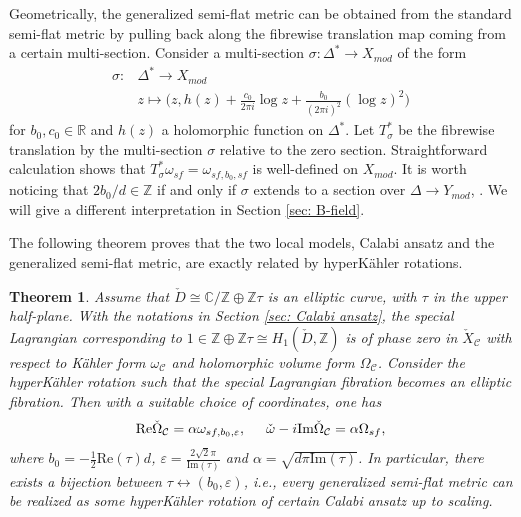 \documentclass[11pt]{amsart}
\theoremstyle{plain}
\newtheorem{thm}{Theorem}[section]
\theoremstyle{definition}
\numberwithin{equation}{section}
\renewcommand{\epsilon}{\varepsilon}
\begin{document}
 Geometrically, the generalized semi-flat metric can be obtained from the standard semi-flat metric by pulling back along the fibrewise translation map coming from a certain multi-section. Consider a multi-section $\sigma: \Delta^*\rightarrow {X}_{mod}$ of the form 
\begin{align*}
	\sigma: &\Delta^*\longrightarrow {X}_{mod}\\
	& z\mapsto \bigg(z,h(z)+ \frac{c_0}{2\pi i}\log{z}+\frac{b_0}{(2\pi i)^2}(\log{z})^2 \bigg)
\end{align*} for $b_0,c_0\in \mathbb{R}$ and $h(z)$ a holomorphic function on $\Delta^*$. Let $T^*_{\sigma}$ be the fibrewise translation by the multi-section $\sigma$ relative to the zero section. Straightforward calculation shows that $T^*_{\sigma}{\omega}_{sf}={\omega}_{sf,b_0,sf}$ is well-defined on ${X}_{mod}$. It is worth noticing that $2b_0/d\in \mathbb{Z}$ if and only if $\sigma$ extends to a section over $\Delta\rightarrow {Y}_{mod}$, \cite[Lemma 3.28]{FM}. We will give a different interpretation in Section \ref{sec: B-field}.

The following theorem proves that the two local models, Calabi ansatz and the generalized semi-flat metric, are exactly related by hyperK\"ahler rotations. 
    \begin{thm}\cite[Appendix A]{CJL2} \label{thm: local model} Assume that $\check{D}\cong \mathbb{C}/\mathbb{Z}\oplus \mathbb{Z}\tau$ is an elliptic curve, with $\tau$ in the upper half-plane. With the notations in Section \ref{sec: Calabi ansatz}, the special Lagrangian corresponding to $1\in \mathbb{Z}\oplus \mathbb{Z}\tau\cong H_1(\check{D},\mathbb{Z})$ is of phase zero in $\check{X}_{\mathcal{C}}$ with respect to K\"ahler form  ${\omega}_{\mathcal{C}}$ and holomorphic volume form ${\Omega}_{\mathcal{C}}$.  Consider the hyperK\"ahler rotation such that the special Lagrangian fibration becomes an elliptic fibration. Then with a suitable choice of coordinates, one has 
	\begin{align*}
		\mbox{Re}\check{\Omega}_{\mathcal{C}}=\alpha{\omega}_{sf,b_0,\epsilon}, \hspace{5mm} \check{\omega}-i\mbox{Im}\check{\Omega}_{\mathcal{C}}=\alpha{\Omega}_{sf},
	\end{align*} 
	where $b_0=-\frac{1}{2}\mbox{Re}(\tau)d$, $\epsilon=\frac{2\sqrt{2}\pi }{\mbox{Im}(\tau)}$ and $\alpha=\sqrt{d\pi \mbox{Im}(\tau)}$. In particular, there exists a bijection between $\tau \leftrightarrow (b_0,\epsilon)$, i.e., every generalized semi-flat metric can be realized as some hyperK\"ahler rotation of certain Calabi ansatz up to scaling. 
\end{thm}
\end{document}
